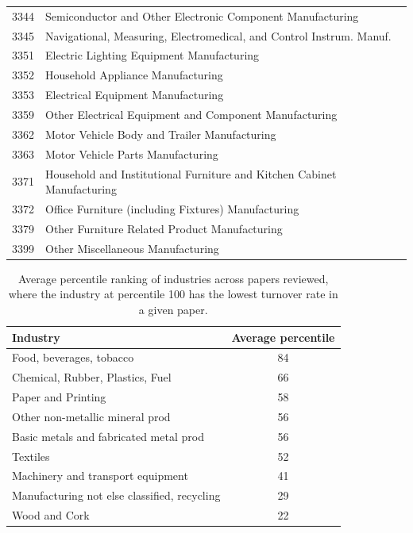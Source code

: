 \begin{spacing}{1}
\begin{longtable}{cl}
3344 &	Semiconductor and Other Electronic Component Manufacturing \\
3345 &	Navigational, Measuring, Electromedical, and Control Instrum. Manuf. \\
3351 &	Electric Lighting Equipment Manufacturing \\
3352 &	Household Appliance Manufacturing \\
3353 &	Electrical Equipment Manufacturing \\
3359 &	Other Electrical Equipment and Component Manufacturing \\
3362 &	Motor Vehicle Body and Trailer Manufacturing \\
3363 &	Motor Vehicle Parts Manufacturing \\
3371 &	Household and Institutional Furniture and Kitchen Cabinet Manufacturing \\
3372 &	Office Furniture (including Fixtures) Manufacturing \\
3379 &	Other Furniture Related Product Manufacturing \\

3399 &	Other Miscellaneous Manufacturing \\
\end{longtable}
\end{spacing}

\begin{table}
\begin{tabular}{l|c}
\textbf{Industry}	&	\textbf{Average percentile} \\
\hline
Food, beverages, tobacco	&	84 \\
Chemical, Rubber, Plastics, Fuel	&	66 \\
Paper and Printing	&	58 \\
Other non-metallic mineral prod	&	56\\
Basic metals and fabricated metal prod	&	56 \\
Textiles	&	52\\
Machinery and transport equipment&		41\\
Manufacturing not else classified, recycling	&	29\\
Wood and Cork	&	22 \\

\end{tabular}
\caption{Average percentile ranking of industries across 
papers reviewed, where the industry at percentile 100 has the lowest turnover
rate in a given paper.}
\end{table}
\clearpage

